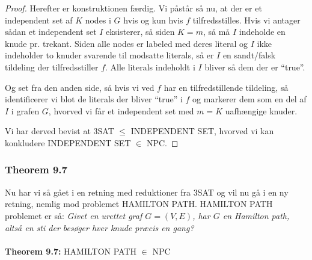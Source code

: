 \begin{proof}
Herefter er konstruktionen færdig. Vi påstår så nu, at der er et independent set af $K$ nodes i $G$ hvis og kun hvis $f$ tilfredsstilles. Hvis vi antager sådan et independent set $I$ eksisterer, så siden $K=m$, så må $I$ indeholde en knude pr. trekant. Siden alle nodes er labeled med deres literal og $I$ ikke indeholder to knuder svarende til modsatte literals, så er $I$ en sandt/falsk tildeling der tilfredsstiller $f$. Alle literals indeholdt i $I$ bliver så dem der er ``true''.

Og set fra den anden side, så hvis vi ved $f$ har en tilfredstillende tildeling, så identificerer vi blot de literals der bliver ``true'' i $f$ og markerer dem som en del af $I$ i grafen $G$, hvorved vi får et independent set med $m=K$ uafhængige knuder.

Vi har derved bevist at 3SAT $\leq$ INDEPENDENT SET, hvorved vi kan konkludere INDEPENDENT SET $\in$ NPC.
\end{proof}

\subsubsection{Theorem 9.7}

Nu har vi så gået i en retning med reduktioner fra 3SAT og vil nu gå i en ny retning, nemlig mod problemet HAMILTON PATH. 
HAMILTON PATH problemet er så: \textit{Givet en urettet graf $G=(V,E)$, har $G$ en Hamilton path, altså en sti der besøger hver knude præcis en gang?}\\
~\\
\textbf{Theorem 9.7:} HAMILTON PATH $\in$ NPC

